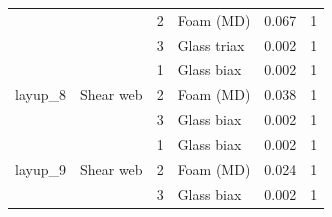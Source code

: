 \begin{table}[htpb]
{\begin{tabular}{llclcc}
 &  & 2 & Foam (MD) & 0.067 & 1 \\
 &  & 3 & Glass triax & 0.002 & 1 \\
\hline
\multirow{3}{*}{layup\_8} & \multirow{3}{*}{Shear web} & 1 & Glass biax & 0.002 & 1 \\
 &  & 2 & Foam (MD) & 0.038 & 1 \\
 &  & 3 & Glass biax & 0.002 & 1 \\
\hline
\multirow{3}{*}{layup\_9} & \multirow{3}{*}{Shear web} & 1 & Glass biax & 0.002 & 1 \\
 &  & 2 & Foam (MD) & 0.024 & 1 \\
 &  & 3 & Glass biax & 0.002 & 1 \\
\hline
\end{tabular}
}
\end{table}